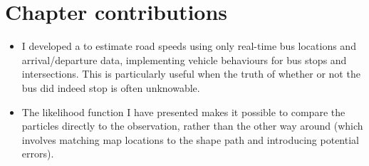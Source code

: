 







\section{Chapter contributions}
\label{sec:pf_contrib}

\begin{itemize}
\item I developed a \pf{} to estimate road speeds using only real-time bus locations and arrival/departure data, implementing vehicle behaviours for bus stops and intersections. This is particularly useful when the truth of whether or not the bus did indeed stop is often unknowable.
\item The likelihood function I have presented makes it possible to compare the particles directly to the observation, rather than the other way around (which involves matching map locations to the shape path and introducing potential errors).
\end{itemize}
